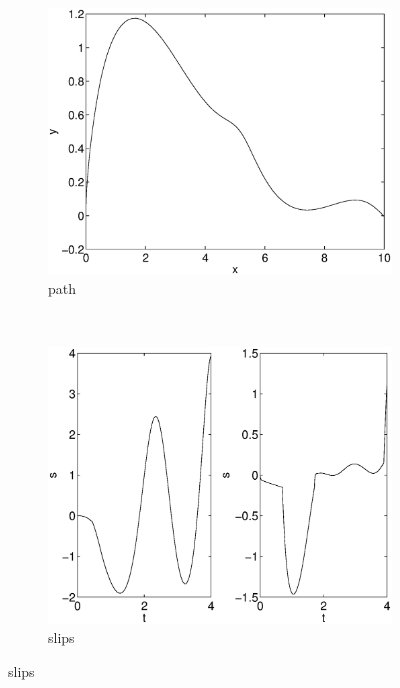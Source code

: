 \begin{figure}
\begin{subfigure}[b]{0.45\textwidth}
\centering
\includegraphics[width=\textwidth]{img/unicycle_path.eps}
\caption{path}
\end{subfigure}
~
\begin{subfigure}[b]{0.45\textwidth}
\centering
\includegraphics[width=\textwidth]{img/unicycle_slips.eps}
\caption{slips}
\end{subfigure}


\end{figure}
